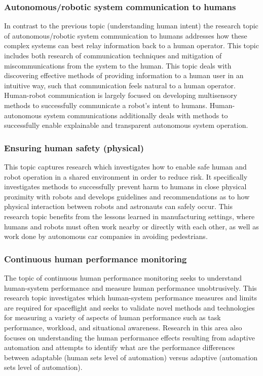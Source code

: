 \subsubsection{Autonomous/robotic system communication to humans}
In contrast to the previous topic (understanding human intent) the research topic of autonomous/robotic system communication to humans addresses how these complex systems can best relay information back to a human operator.
This topic includes both research of communication techniques and mitigation of miscommunications from the system to the human.
This topic deals with discovering effective methods of providing information to a human user in an intuitive way, such that communication feels natural to a human operator.
Human-robot communication is largely focused on developing multisensory methods to successfully communicate a robot's intent to humans.
Human-autonomous system communications additionally deals with methods to successfully enable explainable and transparent autonomous system operation.

\subsubsection{Ensuring human safety (physical)}
This topic captures research which investigates how to enable safe human and robot operation in a shared environment in order to reduce risk.
It specifically investigates methods to successfully prevent harm to humans in close physical proximity with robots and develops guidelines and recommendations as to how physical interaction between robots and astronauts can safely occur.
This research topic benefits from the lessons learned in manufacturing settings, where humans and robots must often work nearby or directly with each other, as well as work done by autonomous car companies in avoiding pedestrians.

\subsubsection{Continuous human performance monitoring}
The topic of continuous human performance monitoring seeks to understand human-system performance and measure human performance unobtrusively.
This research topic investigates which human-system performance measures and limits are required for spaceflight and seeks to validate novel methods and technologies for measuring a variety of aspects of human performance such as task performance, workload, and situational awareness.
Research in this area also focuses on understanding the human performance effects resulting from adaptive automation and attempts to identify what are the performance differences between adaptable (human sets level of automation) versus adaptive (automation sets level of automation).

